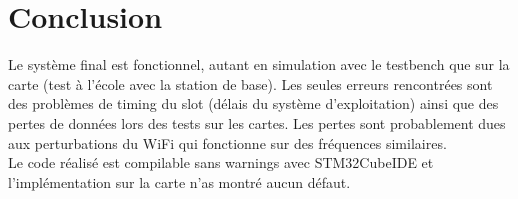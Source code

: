 \documentclass[DeseNET_Sebastien_Deriaz]{subfiles}
\begin{document}
\section{Conclusion}
Le système final est fonctionnel, autant en simulation avec le testbench que sur la carte (test à l'école avec la station de base). Les seules erreurs rencontrées sont des problèmes de timing du slot (délais du système d'exploitation) ainsi que des pertes de données lors des tests sur les cartes. Les pertes sont probablement dues aux perturbations du WiFi qui fonctionne sur des fréquences similaires.\\
Le code réalisé est compilable sans warnings avec STM32CubeIDE et l'implémentation sur la carte n'as montré aucun défaut.\\
\end{document}
